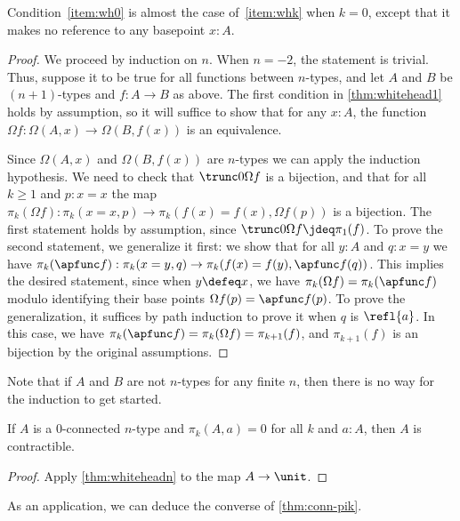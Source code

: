 {\noindent
Condition~\ref{item:wh0} is almost the case of~\ref{item:whk} when $k=0$, except that it makes no reference to any basepoint $x:A$.

\begin{proof}
  We proceed by induction on $n$.
  When $n=-2$, the statement is trivial.
  Thus, suppose it to be true for all functions between $n$-types, and let $A$ and $B$ be $(n+1)$-types and $f:A\to B$ as above.
  The first condition in \cref{thm:whitehead1} holds by assumption, so it will suffice to show that for any $x:A$, the function $\Omega f: \Omega(A,x) \to \Omega(B,f(x))$ is an equivalence.

  Since $\Omega(A,x)$ and $\Omega(B,f(x))$ are $n$-types we can apply the induction hypothesis.
  We need to check that $\trunc 0{\Omega f}$ is a bijection, and that for all $k\geq1$ and $p : x = x$ the map $\pi_k(\Omega f):\pi_k(x = x,p) \to \pi_k(f(x) = f(x),\Omega f(p))$ is a bijection.
  The first statement holds by assumption, since $\trunc 0{\Omega f} \jdeq \pi_1(f)$.
  To prove the second statement, we generalize it first: we show that for all $y : A$ and $q : x = y$ we have $\pi_k(\apfunc f):\pi_k(x = y,q) \to \pi_k(f(x) = f(y),\apfunc f(q))$.
  This implies the desired statement, since when $y\defeq x$, we have $\pi_k(\Omega f)=\pi_k(\apfunc f)$ modulo identifying their base points $\Omega f(p)=\apfunc f(p)$.
  To prove the generalization, it suffices by path induction to prove it when $q$ is $\refl{a}$.
  In this case, we have $\pi_k(\apfunc f) = \pi_k(\Omega f) = \pi_{k+1}(f)$, and $\pi_{k+1}(f)$ is an bijection by the original assumptions.
\end{proof}

Note that if $A$ and $B$ are not $n$-types for any finite $n$, then there is no way for the induction to get started.

\begin{cor}\label{thm:whitehead-contr}
  If $A$ is a $0$-connected $n$-type and $\pi_k(A,a)=0$ for all $k$ and $a:A$, then $A$ is contractible.
\end{cor}
\begin{proof}
  Apply \cref{thm:whiteheadn} to the map $A\to\unit$.
\end{proof}

As an application, we can deduce the converse of \cref{thm:conn-pik}.

}
